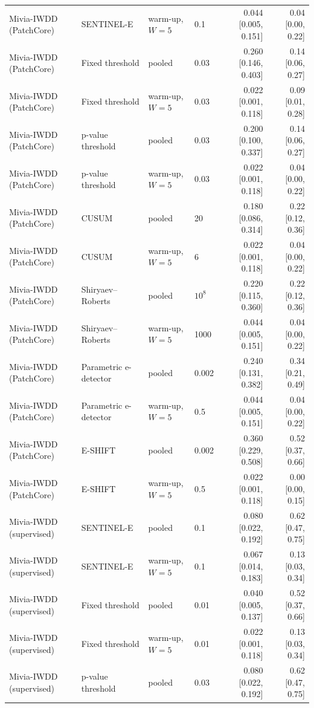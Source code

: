 \begin{table}[t]
{\begin{tabular}{llllrr}
Mivia-IWDD (PatchCore) & SENTINEL-E & warm-up, $W=5$ & 0.1 & 0.044 [0.005, 0.151] & 0.04 [0.00, 0.22] \\
Mivia-IWDD (PatchCore) & Fixed threshold & pooled & 0.03 & 0.260 [0.146, 0.403] & 0.14 [0.06, 0.27] \\
Mivia-IWDD (PatchCore) & Fixed threshold & warm-up, $W=5$ & 0.03 & 0.022 [0.001, 0.118] & 0.09 [0.01, 0.28] \\
Mivia-IWDD (PatchCore) & p-value threshold & pooled & 0.03 & 0.200 [0.100, 0.337] & 0.14 [0.06, 0.27] \\
Mivia-IWDD (PatchCore) & p-value threshold & warm-up, $W=5$ & 0.03 & 0.022 [0.001, 0.118] & 0.04 [0.00, 0.22] \\
Mivia-IWDD (PatchCore) & CUSUM & pooled & 20 & 0.180 [0.086, 0.314] & 0.22 [0.12, 0.36] \\
Mivia-IWDD (PatchCore) & CUSUM & warm-up, $W=5$ & 6 & 0.022 [0.001, 0.118] & 0.04 [0.00, 0.22] \\
Mivia-IWDD (PatchCore) & Shiryaev--Roberts & pooled & $10^{8}$ & 0.220 [0.115, 0.360] & 0.22 [0.12, 0.36] \\
Mivia-IWDD (PatchCore) & Shiryaev--Roberts & warm-up, $W=5$ & 1000 & 0.044 [0.005, 0.151] & 0.04 [0.00, 0.22] \\
Mivia-IWDD (PatchCore) & Parametric e-detector & pooled & 0.002 & 0.240 [0.131, 0.382] & 0.34 [0.21, 0.49] \\
Mivia-IWDD (PatchCore) & Parametric e-detector & warm-up, $W=5$ & 0.5 & 0.044 [0.005, 0.151] & 0.04 [0.00, 0.22] \\
Mivia-IWDD (PatchCore) & E-SHIFT & pooled & 0.002 & 0.360 [0.229, 0.508] & 0.52 [0.37, 0.66] \\
Mivia-IWDD (PatchCore) & E-SHIFT & warm-up, $W=5$ & 0.5 & 0.022 [0.001, 0.118] & 0.00 [0.00, 0.15] \\
Mivia-IWDD (supervised) & SENTINEL-E & pooled & 0.1 & 0.080 [0.022, 0.192] & 0.62 [0.47, 0.75] \\
Mivia-IWDD (supervised) & SENTINEL-E & warm-up, $W=5$ & 0.1 & 0.067 [0.014, 0.183] & 0.13 [0.03, 0.34] \\
Mivia-IWDD (supervised) & Fixed threshold & pooled & 0.01 & 0.040 [0.005, 0.137] & 0.52 [0.37, 0.66] \\
Mivia-IWDD (supervised) & Fixed threshold & warm-up, $W=5$ & 0.01 & 0.022 [0.001, 0.118] & 0.13 [0.03, 0.34] \\
Mivia-IWDD (supervised) & p-value threshold & pooled & 0.03 & 0.080 [0.022, 0.192] & 0.62 [0.47, 0.75] \\

\end{tabular}}
\end{table}
